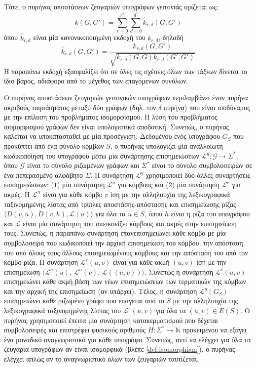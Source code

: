 Τότε, ο πυρήνας αποστάσεων ζευγαριών υπογράφων γειτονιάς ορίζεται ως:
\begin{equation}
    k(G, G') = \sum_{r=0}^{r^*} \sum_{d=0}^{d^*} \hat{k}_{r,d}(G, G')
\end{equation}
όπου $\hat{k}_{r,d}$ είναι μία κανονικοποιημένη εκδοχή του $k_{r,d}$, δηλαδή
\begin{equation*}
    \hat{k}_{r,d}(G,G') = \frac{k_{r,d}(G,G')}{\sqrt{k_{r,d}(G,G) k_{r,d}(G',G')}}
\end{equation*}
Η παραπάνω εκδοχή εξασφαλίζει ότι σε όλες τις σχέσεις όλων των τάξεων δίνεται το ίδιο βάρος, αδιάφορα από το μέγεθος των επαγόμενων συνόλων.\par
Ο πυρήνας αποστάσεων ζευγαριών γειτονικών υπογράφων περιλαμβάνει έναν πυρήνα ακριβούς ταιριάσματος μεταξύ δύο γράφων (δηλ. τον $\delta$ πυρήνα) που είναι ισοδύναμος με την επίλυση του προβλήματος ισομορφισμού.
Η λύση του προβλήματος ισομορφισμού γράφων δεν είναι υπολογιστικά αποδοτική.
Συνεπώς, ο πυρήνας καλείται να υποκατασταθεί με μία προσέγγιση.
Δεδομένου ενός υπογράφου $G_S$ που προκύπτει από ένα σύνολο κόμβων $S$, ο πυρήνας υπολογίζει μία αναλλοίωτη κωδικοποίηση του υπογράφου μέσω μία συνάρτησης επισημειώσεων $\mathcal{L}^g : \mathcal{G} \rightarrow \Sigma^*$, όπου $\mathcal{G}$ είναι το σύνολο ριζωμένων γράφων και $\Sigma^*$ είναι το σύνολο συμβολοσειρών σε ένα πεπερασμένο αλφάβητο $\Sigma$.
Η συνάρτηση $\mathcal{L}^g$ χρησιμοποιεί δύο άλλες συναρτήσεις επισημειώσεων: ($1$) μία συνάρτηση $\mathcal{L}^n$ για κόμβους και ($2$) μία συνάρτηση $\mathcal{L}^e$ για ακμές.
Η $\mathcal{L}^n$ είναι για κάθε κόμβο $v$ ίση με την αλληλουχία της λεξικογραφικά ταξινομημένης λίστας από τρίπλες αποστάσης-απόστασης και επισημείωσης ρίζας $\langle D(v,u), D(v,h), \mathcal{L}(u) \rangle$ για όλα τα $u \in S$, όπου $h$ είναι η ρίζα του υπογράφου και $\mathcal{L}$ είναι μία συνάρτηση που απεικονίζει κόμβους και ακμές στην επισημείωση τους.
Συνεπώς, η παραπάνω συνάρτηση επανεπισημειώνει κάθε κόμβο με μία συμβολοσειρά που κωδικοποιεί την αρχική επισημείωση του κόμβου, την απόσταση του από όλους τους άλλους επισημειωμένους κόμβους και την απόσταση του από τον κόμβο ρίζα.
Η συνάρτηση $\mathcal{L}^e(u,v)$ είναι για κάθε ακμή $(u,v)$ ίση με την επισημείωση $\langle \mathcal{L}^n(u)$, $\mathcal{L}^n(v)$, $\mathcal{L}((u,v)) \rangle$.
Συνεπώς η συνάρτηση $\mathcal{L}^e(u,v)$ επισημειώνει κάθε ακμή βάση των νέων επισημειώσεων των τερματικών της κόμβων και την αρχική της επισημείωση (αν υπάρχει).
Τέλος, η συνάρτηση $\mathcal{L}^g(G_S)$ επισημειώνει κάθε ριζωμένο γράφο που επάγεται από το $S$ με την αλληλουχία της λεξικογραφικά ταξινομημένης λίστας του $\mathcal{L}^e(u,v)$ για όλα τα $(u,v) \in E(S)$.
Ο πυρήνας χρησιμοποιεί έπειτα μία συνάρτηση κατακερματισμού που δέχεται συμβολοσειρές και επιστρέφει φυσικούς αριθμούς $H : \Sigma^* \rightarrow \mathbb{N}$ προκειμένου να εξάγει ένα μοναδικό αναγνωριστικό για κάθε υπογράφο.
Συνεπώς, αντί να ελέγχει για όλα τα ζευγάρια υπογράφων αν είναι ισομορφικά (βλέπε \ref{def:isomorphism}), ο πυρήνας ελέγχει απλώς αν το αναγνωριστικό όλων των ζευγαριών ταυτίζεται.


